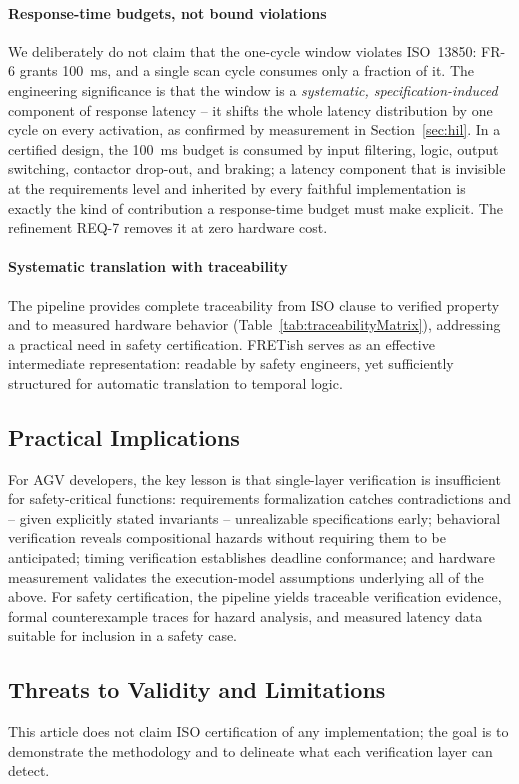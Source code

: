 \documentclass{ieeeaccess}
\theoremstyle{definition}
\begin{document}
\paragraph{Response-time budgets, not bound violations}
We deliberately do not claim that the one-cycle window violates ISO~13850: FR-6 grants 100~ms, and a single scan cycle consumes only a fraction of it. The engineering significance is that the window is a \emph{systematic, specification-induced} component of response latency -- it shifts the whole latency distribution by one cycle on every activation, as confirmed by measurement in Section~\ref{sec:hil}. In a certified design, the 100~ms budget is consumed by input filtering, logic, output switching, contactor drop-out, and braking; a latency component that is invisible at the requirements level and inherited by every faithful implementation is exactly the kind of contribution a response-time budget must make explicit. The refinement REQ-7 removes it at zero hardware cost.

\paragraph{Systematic translation with traceability}
The pipeline provides complete traceability from ISO clause to verified property and to measured hardware behavior (Table~\ref{tab:traceabilityMatrix}), addressing a practical need in safety certification. FRETish serves as an effective intermediate representation: readable by safety engineers, yet sufficiently structured for automatic translation to temporal logic.

\subsection{Practical Implications}
For AGV developers, the key lesson is that single-layer verification is insufficient for safety-critical functions: requirements formalization catches contradictions and -- given explicitly stated invariants -- unrealizable specifications early; behavioral verification reveals compositional hazards without requiring them to be anticipated; timing verification establishes deadline conformance; and hardware measurement validates the execution-model assumptions underlying all of the above. For safety certification, the pipeline yields traceable verification evidence, formal counterexample traces for hazard analysis, and measured latency data suitable for inclusion in a safety case.

\subsection{Threats to Validity and Limitations}
This article does not claim ISO certification of any implementation; the goal is to demonstrate the methodology and to delineate what each verification layer can detect.
\end{document}
